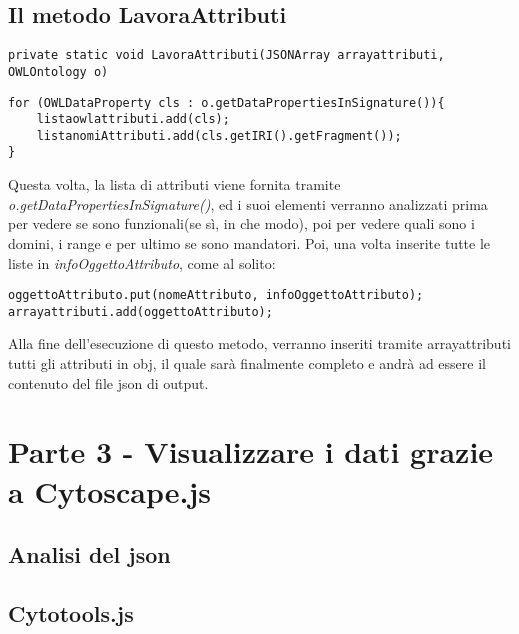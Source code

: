 \documentclass[Lau,binding=0.6cm]{sapthesis}
\begin{document}
\section{Il metodo LavoraAttributi}
\begin{verbatim}
private static void LavoraAttributi(JSONArray arrayattributi, OWLOntology o) 
\end{verbatim}
\begin{verbatim}
for (OWLDataProperty cls : o.getDataPropertiesInSignature()){
    listaowlattributi.add(cls);
    listanomiAttributi.add(cls.getIRI().getFragment());
}
\end{verbatim}

Questa volta, la lista di attributi viene fornita tramite \textit{o.getDataPropertiesInSignature()}, ed i suoi elementi verranno analizzati prima per vedere se sono funzionali(se sì, in che modo), poi per vedere quali sono i domini, i range e per ultimo se sono mandatori. Poi, una volta inserite tutte le liste in \textit{infoOggettoAttributo}, come al solito:
\begin{verbatim}
oggettoAttributo.put(nomeAttributo, infoOggettoAttributo);
arrayattributi.add(oggettoAttributo);
\end{verbatim}
Alla fine dell'esecuzione di questo metodo, verranno inseriti tramite arrayattributi tutti gli attributi in obj, il quale sarà finalmente completo e andrà ad essere il contenuto del file json di output.

\chapter{Parte 3 - Visualizzare i dati grazie a Cytoscape.js }

\section{Analisi del json}

\section{Cytotools.js}



\backmatter
\end{document}
